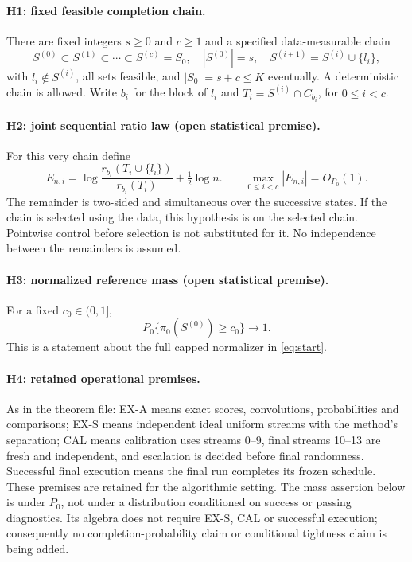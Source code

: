 ﻿\documentclass[11pt]{article}
\newcommand{\Op}{O_{P_0}}
\begin{document}
\paragraph{H1: fixed feasible completion chain.}
There are fixed integers $s\ge0$ and $c\ge1$ and a specified data-measurable chain
\[
 S^{(0)}\subset S^{(1)}\subset\cdots\subset S^{(c)}=S_0,
 \quad |S^{(0)}|=s,\quad S^{(i+1)}=S^{(i)}\cup\{l_i\},
\]
with $l_i\notin S^{(i)}$, all sets feasible, and $|S_0|=s+c\le K$ eventually. A deterministic chain is allowed. Write $b_i$ for the block of $l_i$ and $T_i=S^{(i)}\cap C_{b_i}$, for $0\le i<c$.

\paragraph{H2: joint sequential ratio law (open statistical premise).}
For this very chain define
\[
 E_{n,i}=\log\frac{r_{b_i}(T_i\cup\{l_i\})}{r_{b_i}(T_i)}
            +\tfrac12\log n.
 \qquad \max_{0\le i<c}|E_{n,i}|=\Op(1).
\]
The remainder is two-sided and simultaneous over the successive states. If the chain is selected using the data, this hypothesis is on the selected chain. Pointwise control before selection is not substituted for it. No independence between the remainders is assumed.

\paragraph{H3: normalized reference mass (open statistical premise).}
For a fixed $c_0\in(0,1]$,
\[
 P_0\{\pi_0(S^{(0)})\ge c_0\}\longrightarrow1.
\]
This is a statement about the full capped normalizer in \eqref{eq:start}.

\paragraph{H4: retained operational premises.}
As in the theorem file: EX-A means exact scores, convolutions, probabilities and comparisons; EX-S means independent ideal uniform streams with the method's separation; CAL means calibration uses streams 0--9, final streams 10--13 are fresh and independent, and escalation is decided before final randomness. Successful final execution means the final run completes its frozen schedule. These premises are retained for the algorithmic setting. The mass assertion below is under $P_0$, not under a distribution conditioned on success or passing diagnostics. Its algebra does not require EX-S, CAL or successful execution; consequently no completion-probability claim or conditional tightness claim is being added.
\end{document}
